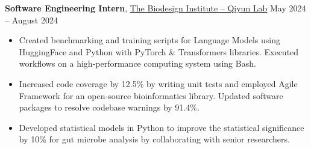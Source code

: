 \documentclass[11pt]{article}       %
\begin{document}
\textbf{Software Engineering Intern}, \href{https://scikit.bio/}{The Biodesign Institute -- Qiyun Lab} \hfill May 2024 -- August 2024 \\
\vspace{-5pt}
\begin{itemize}

    \item Created benchmarking and training scripts for Language Models using HuggingFace and Python with PyTorch \& Transformers libraries. Executed workflows on a high-performance computing system using Bash. 
    \item Increased code coverage by 12.5\% by writing unit tests and employed Agile Framework for an open-source bioinformatics library. Updated software packages to resolve codebase warnings by 91.4\%.
    \item Developed statistical models in Python to improve the statistical significance by 10\% for gut microbe analysis by collaborating with senior researchers. 
\end{itemize}

\end{document}
